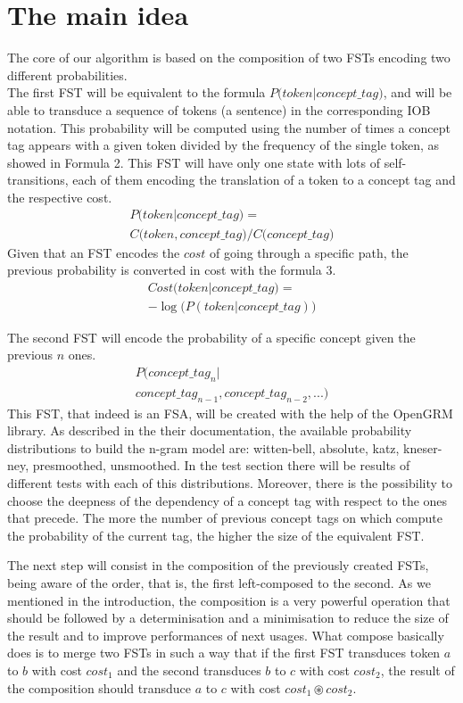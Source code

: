 \documentclass[11pt,a4paper]{article}
\begin{document}
\section{The main idea}

The core of our algorithm is based on the composition of two FSTs encoding two different probabilities.\\
The first FST will be equivalent to the formula $ P \big( token \big | concept\_tag ) $, and will be able to transduce a sequence of tokens (a sentence) in the corresponding IOB notation. This probability will be computed using the number of times a concept tag appears with a given token divided by the frequency of the single token, as showed in Formula 2. This FST will have only one state with lots of self-transitions, each of them encoding the translation of a token to a concept tag and the respective cost.
\begin{multline}
P \big( token | concept\_tag \big) = \\
C \big( token,concept\_tag \big) / C \big( concept\_tag \big)
\end{multline}
Given that an FST encodes the $cost$ of going through a specific path, the previous probability is converted in cost with the formula 3.
\begin{multline}
Cost \big( token | concept\_tag \big) = \\
- \log\big(P ( token | concept\_tag )\big)
\end{multline}

The second FST will encode the probability of a specific concept given the previous $n$ ones.
\begin{multline}
P \big( concept\_tag_n | \\
 concept\_tag_{n-1}, concept\_tag_{n-2}, ... \big)
\end{multline}
This FST, that indeed is an FSA, will be created with the help of the OpenGRM library. As described in the their documentation, the available probability distributions to build the n-gram model are: witten-bell, absolute, katz, kneser-ney, presmoothed, unsmoothed. In the test section there will be results of different tests with each of this distributions. Moreover, there is the possibility to choose the deepness of the dependency of a concept tag with respect to the ones that precede. The more the number of previous concept tags on which compute the probability of the current tag, the higher the size of the equivalent FST.

The next step will consist in the composition of the previously created FSTs, being aware of the order, that is, the first left-composed to the second. As we mentioned in the introduction, the composition is a very powerful operation that should be followed by a determinisation and a minimisation to reduce the size of the result and to improve performances of next usages. What compose basically does is to merge two FSTs in such a way that if the first FST transduces token $a$ to $b$ with cost $cost_1$ and the second transduces $b$ to $c$ with cost $cost_2$, the result of the composition should transduce $a$ to $c$ with cost $ cost_1 \circledast cost_2 $.
\end{document}
